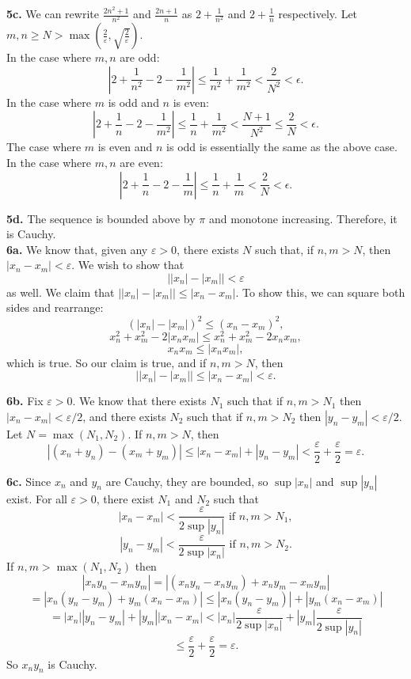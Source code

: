 \documentclass{article}
\newcommand{\eps}{\varepsilon}
\begin{document}
\textbf{5c.} We can rewrite $\frac{2n^2 + 1}{n^2}$ and $\frac{2n + 1}{n}$ as $2 + \frac{1}{n^2}$ and $2 + \frac{1}{n}$ respectively. Let $m, n \ge N > \max\left(\frac{2}{\eps}, \sqrt{\frac{2}{\eps}}\right)$. \\

In the case where $m, n$ are odd:
$$\left|2 + \frac{1}{n^2} - 2 - \frac{1}{m^2}\right| \le \frac{1}{n^2} + \frac{1}{m^2} < \frac{2}{N^2} < \epsilon.$$
In the case where $m$ is odd and $n$ is even:
$$\left|2 + \frac{1}{n} - 2 - \frac{1}{m^2}\right| \le \frac{1}{n} + \frac{1}{m^2} < \frac{N + 1}{N^2} \le \frac{2}{N} < \epsilon.$$
The case where $m$ is even and $n$ is odd is essentially the same as the above case. \\
In the case where $m, n$ are even:
$$\left|2 + \frac{1}{n} - 2 - \frac{1}{m}\right| \le \frac{1}{n} + \frac{1}{m} < \frac{2}{N} < \epsilon.$$

\textbf{5d.} The sequence is bounded above by $\pi$ and monotone increasing. Therefore, it is Cauchy. \\

\textbf{6a.} We know that, given any $\eps > 0$, there exists $N$ such that, if $n, m > N$, then $|x_n - x_m| < \eps$. We wish to show that
$$\left||x_n| - |x_m|\right| < \eps$$
as well. We claim that $\left||x_n| - |x_m|\right| \le |x_n - x_m|$. To show this, we can square both sides and rearrange:
$$(|x_n| - |x_m|)^2 \le (x_n - x_m)^2,$$
$$x_n^2 + x_m^2 - 2|x_nx_m| \le x_n^2 + x_m^2 - 2x_nx_m,$$
$$x_nx_m \le |x_nx_m|,$$
which is true. So our claim is true, and if $n, m > N$, then
$$\left||x_n| - |x_m|\right| \le |x_n - x_m| < \eps.$$

\textbf{6b.} Fix $\eps > 0$. We know that there exists $N_1$ such that if $n, m > N_1$ then $|x_n - x_m| < \eps/2$, and there exists $N_2$ such that if $n, m > N_2$ then $|y_n - y_m| < \eps/2$. Let $N = \max(N_1, N_2)$. If $n, m > N$, then
$$|(x_n + y_n) - (x_m + y_m)| \le |x_n - x_m| + |y_n - y_m| < \frac{\eps}{2} + \frac{\eps}{2} = \eps.$$

\textbf{6c.} Since $x_n$ and $y_n$ are Cauchy, they are bounded, so $\sup|x_n|$ and $\sup|y_n|$ exist. For all $\eps > 0$, there exist $N_1$ and $N_2$ such that
$$|x_n - x_m| < \frac{\eps}{2\sup|y_n|} \text{ if } n, m > N_1,$$
$$|y_n - y_m| < \frac{\eps}{2\sup|x_n|} \text{ if } n, m > N_2.$$
If $n, m > \max(N_1, N_2)$ then
$$|x_ny_n - x_my_m| = |(x_ny_n - x_ny_m) + x_ny_m - x_my_m|$$
$$= |x_n(y_n - y_m) + y_m(x_n - x_m)| \le |x_n(y_n - y_m)| + |y_m(x_n - x_m)|$$
$$= |x_n||y_n - y_m| + |y_m||x_n - x_m| < |x_n|\frac{\eps}{2\sup|x_n|} + |y_m|\frac{\eps}{2\sup|y_n|}$$
$$ \le \frac{\eps}{2} + \frac{\eps}{2} = \eps.$$
So $x_ny_n$ is Cauchy. \\
\end{document}
